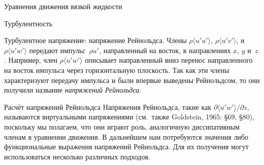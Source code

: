 \begin{chapter}{Уравнения движения вязкой жидкости}
\begin{section}{Турбулентность}
\begin{paragraph}{Турбулентное напряжение: напряжение Рейнольдса.}
Члены $\rho{\langle u' u' \rangle}$, $\rho{\langle u' v'\rangle}$, и
$\rho{\langle u' w' \rangle}$ передают импульс~$\rho u' $, направленный
на восток, в направлениях $x$, $y$ и~$z$. Например, 
член $\rho{\langle u' w'\rangle}$ описывает направленный вниз перенос
направленного на восток импульса через горизонтальную плоскость. 
Так как эти члены характеризуют передачу импульса и были впервые выведены
Рейнольдсом, то они получили название 
\emph{напряжений Рейнольдса}.
%
\end{paragraph}
\end{section}

\begin{section}{Расчёт напряжений Рейнольдса}
%
Напряжения Рейнольдса, такие как $\partial{\langle u'w'\rangle}/\partial{z}$,
называются виртуальными напряжениями (см.\ также Goldstein, 1965: \S{}69, \S{}80),
поскольку мы полагаем, что они играют роль, аналогичную диссипативным членам в 
уравнении движения. В дальнейшем нам потребуются значения либо функциональные
выражения напряжений Рейнольдса. Для их получения могут использоваться 
несколько различных подходов.
%


\end{section}
\end{chapter}
